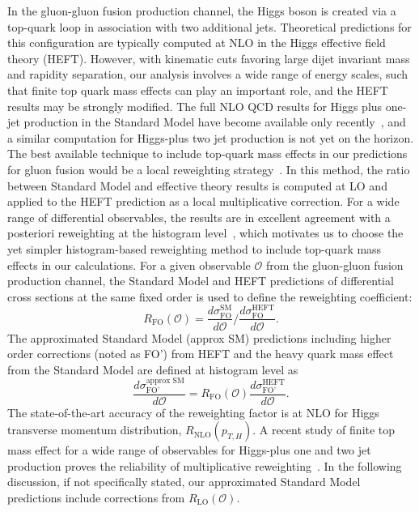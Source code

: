 \documentclass[10pt,prd,fleqn,superscriptaddress,notitlepage,nofootinbib,preprintnumbers,nobalancelastpage]{revtex4-1}
\begin{document}
In the gluon-gluon fusion production channel, the Higgs boson is created via a top-quark loop in association with two additional jets. Theoretical predictions for this configuration are typically computed at NLO in the Higgs effective field theory (HEFT). However, with kinematic cuts favoring large dijet invariant mass and rapidity separation, our analysis involves a wide range of energy scales, such that finite top quark mass effects can play an important role, and the HEFT results may be strongly modified. The full NLO QCD results for Higgs plus one-jet production in the Standard Model have become available only recently~\cite{Lindert:2018iug,Jones:2018hbb}, and a similar computation for Higgs-plus two jet production is not yet on the horizon. The best available technique to include top-quark mass effects in our predictions for gluon fusion would be a local reweighting strategy~\cite{Buschmann:2014sia,Greiner:2016awe,NNLOJETSecDec}. In this method, the ratio between Standard Model and effective theory results is computed at LO and applied to the HEFT prediction as a local multiplicative correction. For a wide range of differential observables, the results are in excellent agreement with a posteriori reweighting at the histogram level~\cite{Chen:2016zka,Becker:2020rjp}, which motivates us to choose the yet simpler histogram-based reweighting method to include top-quark mass effects in our calculations. For a given observable $\mathcal{O}$ from the gluon-gluon fusion production channel, the Standard Model and HEFT predictions of differential cross sections at the same fixed order is used to define the  reweighting coefficient:
\begin{equation}
    R_{\text{FO}}(\mathcal{O})=\frac{d \sigma^{\text{SM}}_{\text{FO}}}{d\mathcal{O}}\bigg/\frac{d \sigma^{\text{HEFT}}_{\text{FO}}}{d\mathcal{O}}.
\end{equation}
The approximated Standard Model (approx SM) predictions including higher order corrections (noted as FO') from HEFT and the heavy quark mass effect from the Standard Model are defined at histogram level as
\begin{equation}
\frac{d \sigma^{\text{approx SM}}_{\text{FO'}}}{d\mathcal{O}} = R_{\text{FO}}(\mathcal{O})\frac{d \sigma^{\text{HEFT}}_{\text{FO'}}}{d\mathcal{O}}.
\label{eq:approxSMdef}
\end{equation}
The state-of-the-art accuracy of the reweighting factor is at NLO for Higgs transverse momentum distribution, $R_{\text{NLO}}(p_{T,H})$. A recent study of finite top mass effect for a wide range of observables for Higgs-plus one and two jet production proves the reliability of multiplicative reweighting~\cite{NNLOJETSecDec}. In the following discussion, if not specifically stated, our approximated Standard Model predictions include corrections from $R_{\text{LO}}(\mathcal{O})$.
\end{document}
